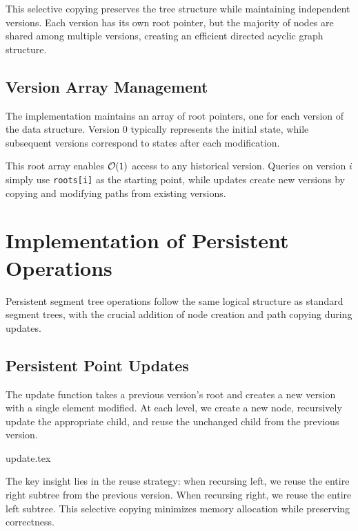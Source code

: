 This selective copying preserves the tree structure while maintaining independent versions. Each version has its own root pointer, but the majority of nodes are shared among multiple versions, creating an efficient directed acyclic graph structure.

\subsection{Version Array Management}

The implementation maintains an array of root pointers, one for each version of the data structure. Version 0 typically represents the initial state, while subsequent versions correspond to states after each modification.

This root array enables $\mathcal{O}(1)$ access to any historical version. Queries on version $i$ simply use \texttt{roots[i]} as the starting point, while updates create new versions by copying and modifying paths from existing versions.

\section{Implementation of Persistent Operations}
\label{sec:update_query_implementation}

Persistent segment tree operations follow the same logical structure as standard segment trees, with the crucial addition of node creation and path copying during updates.

\subsection{Persistent Point Updates}
The update function takes a previous version's root and creates a new version with a single element modified. At each level, we create a new node, recursively update the appropriate child, and reuse the unchanged child from the previous version.

\begin{algorithm}[H]
{update.tex}
\end{algorithm}
\vspace{1em}
The key insight lies in the reuse strategy: when recursing left, we reuse the entire right subtree from the previous version. When recursing right, we reuse the entire left subtree. This selective copying minimizes memory allocation while preserving correctness.

